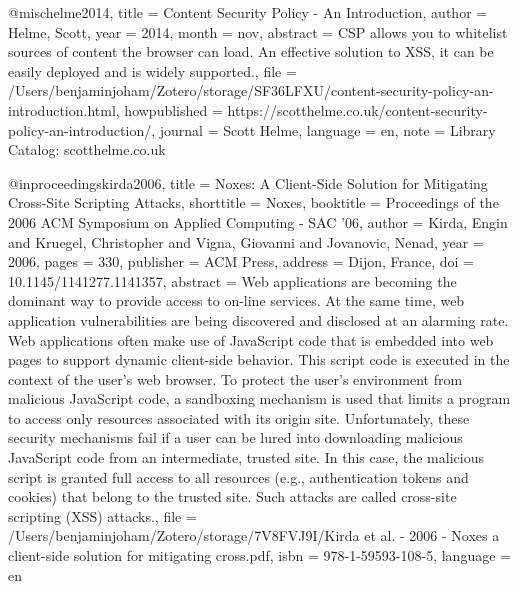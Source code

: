 @misc{helme2014,
  title = {Content {{Security Policy}} - {{An Introduction}}},
  author = {Helme, Scott},
  year = {2014},
  month = nov,
  abstract = {CSP allows you to whitelist sources of content the browser can load. An effective solution to XSS, it can be easily deployed and is widely supported.},
  file = {/Users/benjaminjoham/Zotero/storage/SF36LFXU/content-security-policy-an-introduction.html},
  howpublished = {https://scotthelme.co.uk/content-security-policy-an-introduction/},
  journal = {Scott Helme},
  language = {en},
  note = {Library Catalog: scotthelme.co.uk}
}

@inproceedings{kirda2006,
  title = {Noxes: A Client-Side Solution for Mitigating Cross-Site Scripting Attacks},
  shorttitle = {Noxes},
  booktitle = {Proceedings of the 2006 {{ACM}} Symposium on {{Applied}} Computing  - {{SAC}} '06},
  author = {Kirda, Engin and Kruegel, Christopher and Vigna, Giovanni and Jovanovic, Nenad},
  year = {2006},
  pages = {330},
  publisher = {{ACM Press}},
  address = {{Dijon, France}},
  doi = {10.1145/1141277.1141357},
  abstract = {Web applications are becoming the dominant way to provide access to on-line services. At the same time, web application vulnerabilities are being discovered and disclosed at an alarming rate. Web applications often make use of JavaScript code that is embedded into web pages to support dynamic client-side behavior. This script code is executed in the context of the user's web browser. To protect the user's environment from malicious JavaScript code, a sandboxing mechanism is used that limits a program to access only resources associated with its origin site. Unfortunately, these security mechanisms fail if a user can be lured into downloading malicious JavaScript code from an intermediate, trusted site. In this case, the malicious script is granted full access to all resources (e.g., authentication tokens and cookies) that belong to the trusted site. Such attacks are called cross-site scripting (XSS) attacks.},
  file = {/Users/benjaminjoham/Zotero/storage/7V8FVJ9I/Kirda et al. - 2006 - Noxes a client-side solution for mitigating cross.pdf},
  isbn = {978-1-59593-108-5},
  language = {en}
}


